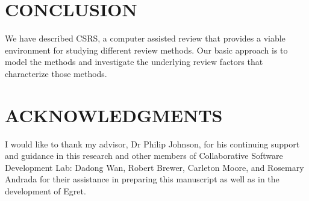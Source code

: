 \section {CONCLUSION}
We have described CSRS, a computer assisted review that provides a
viable environment for studying different review methods. Our basic
approach is to model the methods and investigate the underlying review
factors that characterize those methods. 

\section{ACKNOWLEDGMENTS}
I would like to thank my advisor, Dr Philip Johnson, for his
continuing support and guidance in this research and other members of 
Collaborative Software Development Lab: Dadong Wan, Robert Brewer,
Carleton Moore, and Rosemary Andrada for their assistance in preparing
this manuscript as well as in the development of
Egret\cite{Johnson92}. 






